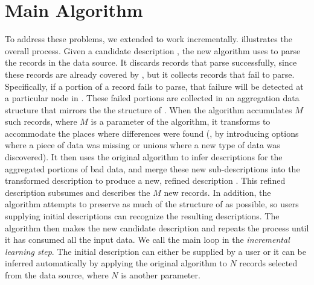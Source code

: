 \section{Main Algorithm}\label{sec:algo}

To address these problems, we extended \learnpads{} to work
incrementally.  
 illustrates the overall process.
Given a candidate description , the new algorithm uses  to parse
the records in the data source.  
It discards records that parse successfully, since these records are
already covered by , but it collects records that fail to parse.
Specifically, if a portion of a record fails to parse,
that failure will be detected at a particular node in .
These failed portions are collected
in an aggregation data structure  that mirrors the the structure
of . When the algorithm accumulates $M$ such records, where $M$ is a
parameter of the algorithm, it transforms  to accommodate the places 
where differences were found (\ie, by introducing options where a piece of
data was missing or unions where a new type of data was discovered).
It then uses the original \learnpads{} algorithm to infer descriptions
for the aggregated portions of bad data, and merge these new
sub-descriptions into the transformed description to produce a new,
refined description . This refined
description subsumes  and describes the $M$
new records.  In addition, the algorithm attempts to preserve as much
of the structure of  as possible, so users supplying initial
descriptions can recognize the resulting descriptions. 
The algorithm then makes 
the new candidate description and repeats the process until it
has consumed all the input data. We call the main loop in 
 the {\em incremental learning step}.
The initial description  can either be supplied by a user or it
can be inferred automatically by applying the original algorithm to
$N$ records selected from the data source, where $N$ is another
parameter.  


